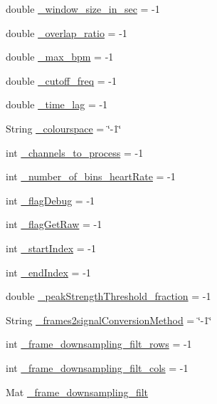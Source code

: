 \begin{DoxyCompactItemize}
double \hyperlink{namespace_m_h_r_a9732a5bb1cbdb99030149ae2bb1cae69}{\+\_\+window\+\_\+size\+\_\+in\+\_\+sec} = -\/1
\item 
double \hyperlink{namespace_m_h_r_aed0501a3045731a781439b11ee82fbfe}{\+\_\+overlap\+\_\+ratio} = -\/1
\item 
double \hyperlink{namespace_m_h_r_a1a13273dd519ccfaf4dc1800bd2031d2}{\+\_\+max\+\_\+bpm} = -\/1
\item 
double \hyperlink{namespace_m_h_r_a9685359cac4522cd1ee584fbfb5371d1}{\+\_\+cutoff\+\_\+freq} = -\/1
\item 
double \hyperlink{namespace_m_h_r_abe9f5a6b09e1219712f2b5912e68506d}{\+\_\+time\+\_\+lag} = -\/1
\item 
String \hyperlink{namespace_m_h_r_a16dd6a785863f2fac97ebb334606c166}{\+\_\+colourspace} = \char`\"{}-\/1\char`\"{}
\item 
int \hyperlink{namespace_m_h_r_a02a81ed541f6536b1632d65c8f2ad0d3}{\+\_\+channels\+\_\+to\+\_\+process} = -\/1
\item 
int \hyperlink{namespace_m_h_r_a5a4548440538bf0354499b42e7983f2f}{\+\_\+number\+\_\+of\+\_\+bins\+\_\+heart\+Rate} = -\/1
\item 
int \hyperlink{namespace_m_h_r_ae2f1f5bafa06074dcb8f0af01a058c81}{\+\_\+flag\+Debug} = -\/1
\item 
int \hyperlink{namespace_m_h_r_ab142c69d1b89170b4fa2533a6f749394}{\+\_\+flag\+Get\+Raw} = -\/1
\item 
int \hyperlink{namespace_m_h_r_a7650c1d1c25787e60c4dbbdb5cedf3b8}{\+\_\+start\+Index} = -\/1
\item 
int \hyperlink{namespace_m_h_r_a43ac6cb857f86cd5a9bc16e968faa1af}{\+\_\+end\+Index} = -\/1
\item 
double \hyperlink{namespace_m_h_r_a8a80b7897b02d4d2a57311a344df8497}{\+\_\+peak\+Strength\+Threshold\+\_\+fraction} = -\/1
\item 
String \hyperlink{namespace_m_h_r_aaaae88f4be078b944fe63b49c5022684}{\+\_\+frames2signal\+Conversion\+Method} = \char`\"{}-\/1\char`\"{}
\item 
int \hyperlink{namespace_m_h_r_a41fcc40bb1f54975292b8d7051b7b3f9}{\+\_\+frame\+\_\+downsampling\+\_\+filt\+\_\+rows} = -\/1
\item 
int \hyperlink{namespace_m_h_r_a619373c68caeeba93f71d9eaeecf1a5b}{\+\_\+frame\+\_\+downsampling\+\_\+filt\+\_\+cols} = -\/1
\item 
Mat \hyperlink{namespace_m_h_r_a8d2bbf36755f538d9b442b415d5cde6d}{\+\_\+frame\+\_\+downsampling\+\_\+filt}
\item 

\end{DoxyCompactItemize}

